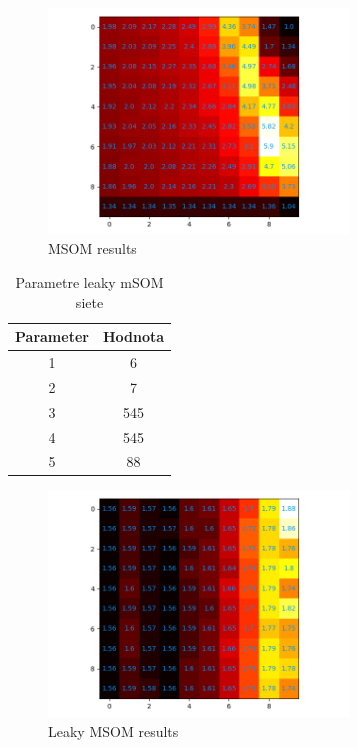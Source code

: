 \begin{figure}[H]
    \centering
    \includegraphics[width=8cm]{assets/msom_abcd}
    \caption{MSOM results}
\end{figure}


\begin{table}[h!]
    \centering
    \begin{tabular}{|c|c|} 
     \hline
     Parameter & Hodnota \\ 
     \hline\hline
     1 & 6  \\ 
     \hline
     2 & 7   \\
     \hline
     3 & 545  \\
     \hline
     4 & 545  \\
     \hline
     5 & 88 \\  
     \hline
    \end{tabular}
    \caption{Parametre leaky mSOM siete}
    \label{table:2}
\end{table}

\begin{figure}[H]
    \centering
    \includegraphics[width=8cm]{assets/leakymsom_abcd}
    \caption{Leaky MSOM results}
\end{figure}
